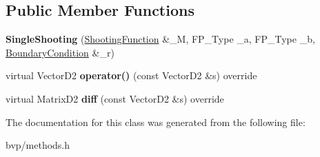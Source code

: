 \subsection*{Public Member Functions}
\begin{DoxyCompactItemize}
\item 
\mbox{\label{classSingleShooting_ad9dc199aea00e22bcbeb4e92a256ad4f}} 
{\bfseries Single\+Shooting} (\hyperlink{classShootingFunction}{Shooting\+Function} \&\+\_\+M, F\+P\+\_\+\+Type \+\_\+a, F\+P\+\_\+\+Type \+\_\+b, \hyperlink{classBoundaryCondition}{Boundary\+Condition} \&\+\_\+r)
\item 
\mbox{\label{classSingleShooting_a6ffb84c5c62c86691154d41f67ff303a}} 
virtual Vector\+D2 {\bfseries operator()} (const Vector\+D2 \&s) override
\item 
\mbox{\label{classSingleShooting_a29ada16c267ba2658c991092b59ce49d}} 
virtual Matrix\+D2 {\bfseries diff} (const Vector\+D2 \&s) override
\end{DoxyCompactItemize}


The documentation for this class was generated from the following file\+:\begin{DoxyCompactItemize}
\item 
bvp/methods.\+h\end{DoxyCompactItemize}
